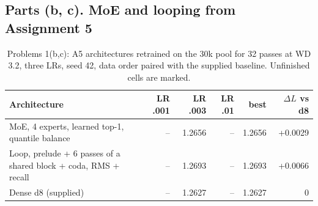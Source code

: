 \subsection*{Parts (b, c). MoE and looping from Assignment 5}



\begin{table}[H]\centering\small\caption{Problems 1(b,c): A5 architectures retrained on the 30k pool for 32 passes at WD 3.2, three LRs, seed 42, data order paired with the supplied baseline. Unfinished cells are marked.}\label{tab:p1ours}
\begin{tabular}{lrrrrr}\toprule Architecture & LR .001 & LR .003 & LR .01 & best & $\Delta L$ vs d8 \\ \midrule
MoE, 4 experts, learned top-1, quantile balance & -- & 1.2656 & -- & 1.2656 & +0.0029 \\
Loop, prelude + 6 passes of a shared block + coda, RMS + recall & -- & 1.2693 & -- & 1.2693 & +0.0066 \\
Dense d8 (supplied) & -- & 1.2627 & -- & 1.2627 & 0 \\
\bottomrule\end{tabular}\end{table}
